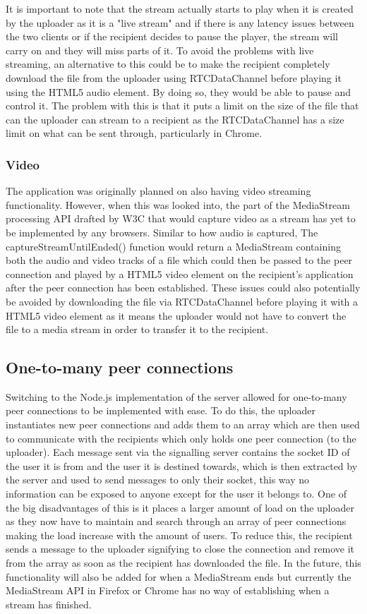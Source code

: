 \documentclass[]{report}
\begin{document}
				It is important to note that the stream actually starts to play when it is created by the uploader as it is a "live stream" and if there is any latency issues between the two clients or if the recipient decides to pause the player, the stream will carry on and they will miss parts of it. To avoid the problems with live streaming, an alternative to this could be to make the recipient completely download the file from the uploader using RTCDataChannel before playing it using the HTML5 audio element. By doing so, they would be able to pause and control it. The problem with this is that it puts a limit on the size of the file that can the uploader can stream to a recipient as the RTCDataChannel has a size limit on what can be sent through, particularly in Chrome.

				\subsubsection{Video}
				The application was originally planned on also having video streaming functionality. However, when this was looked into, the part of the MediaStream processing API drafted by W3C \cite{MediaStream API} that would capture video as a stream has yet to be implemented by any browsers. Similar to how audio is captured, The captureStreamUntilEnded() function would return a MediaStream containing both the audio and video tracks of a file which could then be passed to the peer connection and played by a HTML5 video element on the recipient's application after the peer connection has been established. These issues could also potentially be avoided by downloading the file via RTCDataChannel before playing it with a HTML5 video element as it means the uploader would not have to convert the file to a media stream in order to transfer it to the recipient.
			
			\subsection{One-to-many peer connections}
			Switching to the Node.js implementation of the server allowed for one-to-many peer connections to be implemented with ease. To do this, the uploader instantiates new peer connections and adds them to an array which are then used to communicate with the recipients which only holds one peer connection (to the uploader). Each message sent via the signalling server contains the socket ID of the user it is from and the user it is destined towards, which is then extracted by the server and used to send messages to only their socket, this way no information can be exposed to anyone except for the user it belongs to. One of the big disadvantages of this is it places a larger amount of load on the uploader as they now have to maintain and search through an array of peer connections making the load increase with the amount of users. To reduce this, the recipient sends a message to the uploader signifying to close the connection and remove it from the array as soon as the recipient has downloaded the file. In the future, this functionality will also be added for when a MediaStream ends but currently the MediaStream API in Firefox or Chrome has no way of establishing when a stream has finished.
			 
\end{document}
